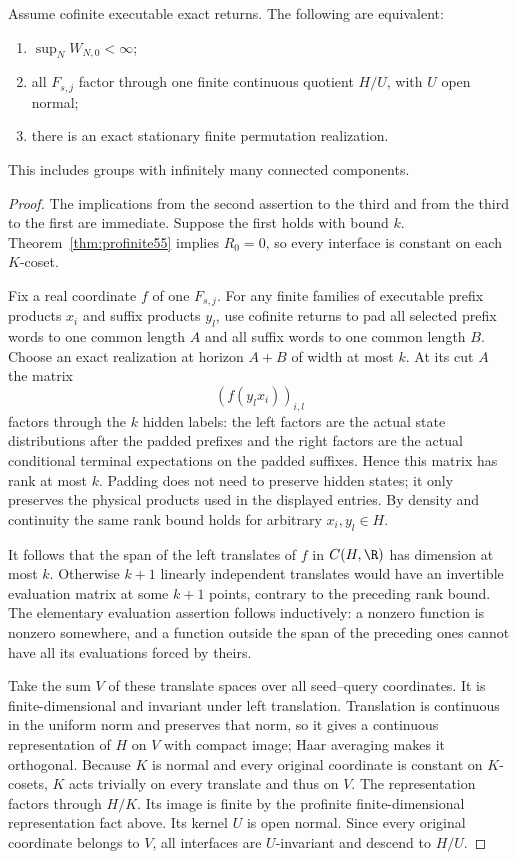\begin{theorem}\label{thm:zero55}
Assume cofinite executable exact returns. The following are equivalent:
\begin{enumerate}
\item $\sup_NW_{N,0}<\infty$;
\item all $F_{s,j}$ factor through one finite continuous quotient $H/U$, with $U$ open normal;
\item there is an exact stationary finite permutation realization.
\end{enumerate}
This includes groups with infinitely many connected components.
\end{theorem}
\begin{proof}
The implications from the second assertion to the third and from the third to the first are immediate. Suppose the first holds with bound $k$. Theorem~\ref{thm:profinite55} implies $R_0=0$, so every interface is constant on each $K$-coset.

Fix a real coordinate $f$ of one $F_{s,j}$. For any finite families of executable prefix products $x_i$ and suffix products $y_l$, use cofinite returns to pad all selected prefix words to one common length $A$ and all suffix words to one common length $B$. Choose an exact realization at horizon $A+B$ of width at most $k$. At its cut $A$ the matrix
\[
                            (f(y_lx_i))_{i,l}
\]
factors through the $k$ hidden labels: the left factors are the actual state distributions after the padded prefixes and the right factors are the actual conditional terminal expectations on the padded suffixes. Hence this matrix has rank at most $k$. Padding does not need to preserve hidden states; it only preserves the physical products used in the displayed entries. By density and continuity the same rank bound holds for arbitrary $x_i,y_l\in H$.

It follows that the span of the left translates of $f$ in $C(H,\R)$ has dimension at most $k$. Otherwise $k+1$ linearly independent translates would have an invertible evaluation matrix at some $k+1$ points, contrary to the preceding rank bound. The elementary evaluation assertion follows inductively: a nonzero function is nonzero somewhere, and a function outside the span of the preceding ones cannot have all its evaluations forced by theirs.

Take the sum $V$ of these translate spaces over all seed--query coordinates. It is finite-dimensional and invariant under left translation. Translation is continuous in the uniform norm and preserves that norm, so it gives a continuous representation of $H$ on $V$ with compact image; Haar averaging makes it orthogonal. Because $K$ is normal and every original coordinate is constant on $K$-cosets, $K$ acts trivially on every translate and thus on $V$. The representation factors through $H/K$. Its image is finite by the profinite finite-dimensional representation fact above. Its kernel $U$ is open normal. Since every original coordinate belongs to $V$, all interfaces are $U$-invariant and descend to $H/U$.
\end{proof}

